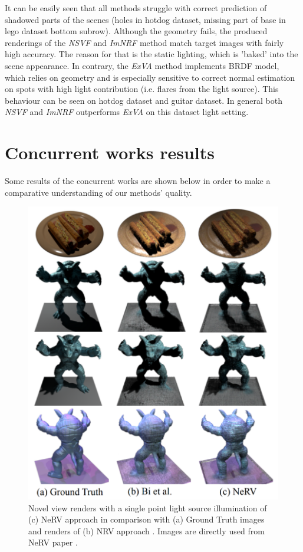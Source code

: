It can be easily seen that all methods struggle
with correct prediction of shadowed parts of the scenes
(holes in hotdog dataset, missing part of base in lego dataset bottom subrow).
Although the geometry fails, the produced renderings
of the \textit{NSVF} and \textit{ImNRF} method match target images with fairly high accuracy.
The reason for that is the static lighting, which is 'baked' into the scene appearance.
In contrary, the \textit{ExVA} method implements BRDF model,
which relies on geometry and is especially sensitive to correct normal estimation
on spots with high light contribution (i.e. flares from the light source).
This behaviour can be seen on hotdog dataset and guitar dataset.
In general both \textit{NSVF} and \textit{ImNRF} outperforms \textit{ExVA} on this dataset light setting.



\section{Concurrent works results}

Some results of the concurrent works are shown below
in order to make a comparative understanding of our methods' quality.

\begin{figure}[!htb]
    \centering
    \includegraphics[width=\textwidth]{figures/concurrent/nerv.png}
    \caption{Novel view renders with a single point light source illumination of (c) NeRV approach \cite{nerv2021}
    in comparison with (a) Ground Truth images and renders of (b) NRV approach \cite{bi2020neural}.
    Images are directly used from NeRV paper \cite{nerv2021}.
    }
    \label{fig:concur_nerv}
\end{figure}


